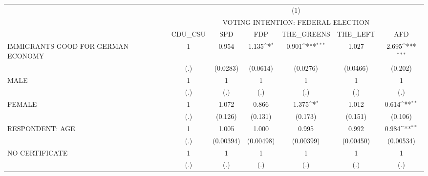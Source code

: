 {
\def\sym#1{\ifmmode^{#1}\else\(^{#1}\)\fi}
\begin{tabular}{l*{6}{c}}
\hline\hline
                              &\multicolumn{6}{c}{(1)}                                                                                                \\
                              &\multicolumn{6}{c}{VOTING INTENTION: FEDERAL ELECTION}                                                                 \\
                              &   CDU\_CSU         &       SPD         &       FDP         &THE\_GREENS         &  THE\_LEFT         &       AFD         \\
\hline
IMMIGRANTS GOOD FOR GERMAN ECONOMY&         1         &     0.954         &     1.135\sym{*}  &     0.901\sym{***}&     1.027         &     2.695\sym{***}\\
                              &       (.)         &  (0.0283)         &  (0.0614)         &  (0.0276)         &  (0.0466)         &   (0.202)         \\
[1em]
MALE                          &         1         &         1         &         1         &         1         &         1         &         1         \\
                              &       (.)         &       (.)         &       (.)         &       (.)         &       (.)         &       (.)         \\
[1em]
FEMALE                        &         1         &     1.072         &     0.866         &     1.375\sym{*}  &     1.012         &     0.614\sym{**} \\
                              &       (.)         &   (0.126)         &   (0.131)         &   (0.173)         &   (0.151)         &   (0.106)         \\
[1em]
RESPONDENT: AGE               &         1         &     1.005         &     1.000         &     0.995         &     0.992         &     0.984\sym{**} \\
                              &       (.)         & (0.00394)         & (0.00498)         & (0.00399)         & (0.00450)         & (0.00534)         \\
[1em]
NO CERTIFICATE                &         1         &         1         &         1         &         1         &         1         &         1         \\
                              &       (.)         &       (.)         &       (.)         &       (.)         &       (.)         &       (.)         \\

\end{tabular}}
